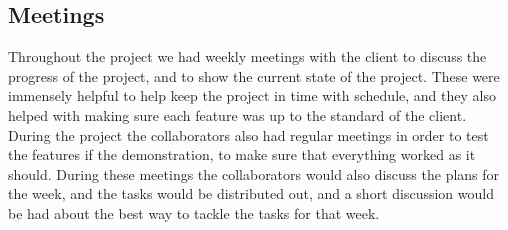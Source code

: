 \subsection{Meetings}
	Throughout the project we had weekly meetings with the client to discuss the progress of the project, and to show the current state of the project. These were immensely helpful to help keep the project in time with schedule, and they also helped with making sure each feature was up to the standard of the client.
	During the project the collaborators also had regular meetings in order to test the features if the demonstration, to make sure that everything worked as it should. During these meetings the collaborators would also discuss the plans for the week, and the tasks would be distributed out, and a short discussion would be had about the best way to tackle the tasks for that week.